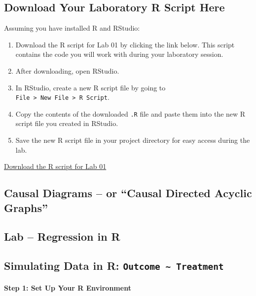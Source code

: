 \documentclass[
  singlecolumn]{article}
\let\oldparagraph\paragraph
\renewcommand{\paragraph}[1]{\oldparagraph{#1}\mbox{}}
\theoremstyle{definition}
\theoremstyle{remark}
\begin{document}
\subsection{Download Your Laboratory R Script
Here}\label{download-your-laboratory-r-script-here-1}

Assuming you have installed R and RStudio:

\begin{enumerate}
\def\labelenumi{\arabic{enumi}.}
\item
  Download the R script for Lab 01 by clicking the link below. This
  script contains the code you will work with during your laboratory
  session.
\item
  After downloading, open RStudio.
\item
  In RStudio, create a new R script file by going to
  \texttt{File\ \textgreater{}\ New\ File\ \textgreater{}\ R\ Script}.
\item
  Copy the contents of the downloaded \texttt{.R} file and paste them
  into the new R script file you created in RStudio.
\item
  Save the new R script file in your project directory for easy access
  during the lab.
\end{enumerate}

\href{https://raw.githubusercontent.com/go-bayes/psyc-434-2024/main/laboratory/01-lab.R}{Download
the R script for Lab 01}

\subsection{Causal Diagrams -- or ``Causal Directed Acyclic
Graphs''}\label{causal-diagrams-or-causal-directed-acyclic-graphs}

\subsection{Lab -- Regression in R}\label{lab-regression-in-r}

\subsection{\texorpdfstring{Simulating Data in R:
\texttt{Outcome\ \textasciitilde{}\ Treatment}}{Simulating Data in R: Outcome \textasciitilde{} Treatment}}\label{simulating-data-in-r-outcome-treatment}

\paragraph{Step 1: Set Up Your R
Environment}\label{step-1-set-up-your-r-environment}
\end{document}
